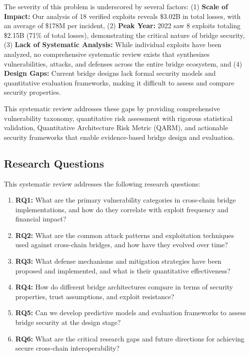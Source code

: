 \documentclass[runningheads]{llncs}
\begin{document}
The severity of this problem is underscored by several factors: (1) \textbf{Scale of Impact:} Our analysis of 18 verified exploits reveals \$3.02B in total losses, with an average of \$178M per incident, (2) \textbf{Peak Year:} 2022 saw 8 exploits totaling \$2.15B (71\% of total losses), demonstrating the critical nature of bridge security, (3) \textbf{Lack of Systematic Analysis:} While individual exploits have been analyzed, no comprehensive systematic review exists that synthesizes vulnerabilities, attacks, and defenses across the entire bridge ecosystem, and (4) \textbf{Design Gaps:} Current bridge designs lack formal security models and quantitative evaluation frameworks, making it difficult to assess and compare security properties.

This systematic review addresses these gaps by providing comprehensive vulnerability taxonomy, quantitative risk assessment with rigorous statistical validation, Quantitative Architecture Risk Metric (QARM), and actionable security frameworks that enable evidence-based bridge design and evaluation.

\subsection{Research Questions}
This systematic review addresses the following research questions:

\begin{enumerate}
    \item \textbf{RQ1:} What are the primary vulnerability categories in cross-chain bridge implementations, and how do they correlate with exploit frequency and financial impact?
    
    \item \textbf{RQ2:} What are the common attack patterns and exploitation techniques used against cross-chain bridges, and how have they evolved over time?
    
    \item \textbf{RQ3:} What defense mechanisms and mitigation strategies have been proposed and implemented, and what is their quantitative effectiveness?
    
    \item \textbf{RQ4:} How do different bridge architectures compare in terms of security properties, trust assumptions, and exploit resistance?
    
    \item \textbf{RQ5:} Can we develop predictive models and evaluation frameworks to assess bridge security at the design stage?
    
    \item \textbf{RQ6:} What are the critical research gaps and future directions for achieving secure cross-chain interoperability?
\end{enumerate}
\end{document}
